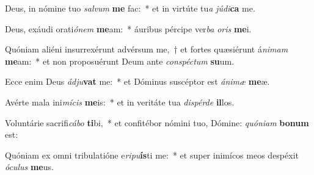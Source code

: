 \item Deus, in nómine tuo \textit{sal}\textit{vum} \textbf{me} fac:~* et in virtúte tu\textit{a} \textit{jú}\textit{di}\textbf{ca} me.
\item Deus, exáudi orati\textit{ó}\textit{nem} \textbf{me}am:~* áuribus pércipe ver\textit{ba} \textit{o}\textit{ris} \textbf{me}i.
\item Quóniam aliéni insurrexérunt advérsum me,~† et fortes quæsiérunt á\textit{ni}\textit{mam} \textbf{me}am:~* et non proposuérunt Deum ante \textit{con}\textit{spéc}\textit{tum} \textbf{su}um.
\item Ecce enim Deus \textit{ád}\textit{ju}\textbf{vat} me:~* et Dóminus suscéptor est \textit{á}\textit{ni}\textit{mæ} \textbf{me}æ.
\item Avérte mala ini\textit{mí}\textit{cis} \textbf{me}is:~* et in veritáte tua \textit{dis}\textit{pér}\textit{de} \textbf{il}los.
\item Voluntárie sacrifi\textit{cá}\textit{bo} \textbf{ti}bi,~* et confitébor nómini tuo, Dómine: \textit{quón}\textit{i}\textit{am} \textbf{bo}\textbf{num} est:
\item Quóniam ex omni tribulatióne e\textit{ri}\textit{pu}\textbf{ís}ti me:~* et super inimícos meos despéxit \textit{ó}\textit{cu}\textit{lus} \textbf{me}us.
